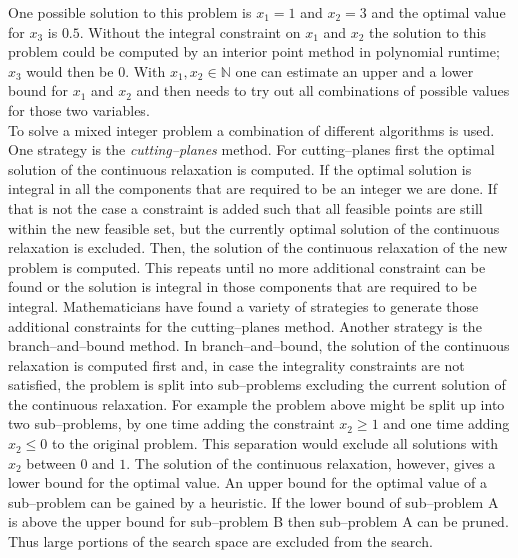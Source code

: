 One possible solution to this problem is $x_1=1$ and $x_2=3$ and the optimal value for $x_3$ is $0.5$. Without the integral constraint on $x_1$ and $x_2$ the solution to this problem could be computed by an interior point method in polynomial runtime; $x_3$ would then be $0$. With $x_1,x_2\in \mathbb{N}$ one can estimate an upper and a lower bound for $x_1$ and $x_2$ and then needs to try out all combinations of possible values for those two variables.\\
To solve a mixed integer problem a combination of different algorithms is used. One strategy is the \emph{cutting--planes} method. For cutting--planes first the optimal solution of the continuous relaxation is computed. If the optimal solution is integral in all the components that are required to be an integer we are done. If that is not the case a constraint is added such that all feasible points are still within the new feasible set, but the currently optimal solution of the continuous relaxation is excluded. Then, the solution of the continuous relaxation of the new problem is computed. This repeats until no more additional constraint can be found or the solution is integral in those components that are required to be integral. Mathematicians have found a variety of strategies to generate those additional constraints for the cutting--planes method. Another strategy is the branch--and--bound method. In branch--and--bound, the solution of the continuous relaxation is computed first and, in case the integrality constraints are not satisfied, the problem is split into sub--problems excluding the current solution of the continuous relaxation. For example the problem above might be split up into two sub--problems, by one time adding the constraint $x_2\geq 1$ and one time adding $x_2\leq 0$ to the original problem. This separation would exclude all solutions with $x_2$ between $0$ and $1$. The solution of the continuous relaxation, however, gives a lower bound for the optimal value. An upper bound for the optimal value of a sub--problem can be gained by a heuristic. If the lower bound of sub--problem A is above the upper bound for sub--problem B then sub--problem A can be pruned. Thus large portions of the search space are excluded from the search.

